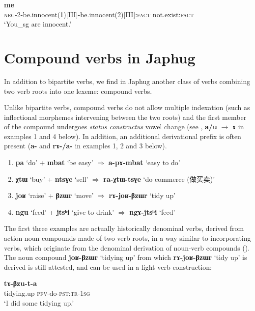 \documentclass[oneside,a4paper,11pt]{article}
\newcommand{\ipa}[1]{{\phon\textbf{#1}}}
\newcommand{\zh}[1]{{\cn #1}}
\newcommand{\jpg}[2]{\ipa{#1} `#2'}
\begin{document}
\begin{exe}
\ex \label{ex:mAtWspe2}
\gll \ipa{mɤ-tɯ-spe=rke} \ipa{me} \\
\textsc{neg}-2-be.innocent(1)[III]-be.innocent(2)[III]:\textsc{fact} not.exist:\textsc{fact} \\
\glt `You_{sg} are innocent.'
\end{exe} 

\section{Compound verbs in Japhug} \label{sec:compounds}
In addition to bipartite verbs, we find in Japhug another class of verbs combining two verb roots into one lexeme: compound verbs.

Unlike bipartite verbs,  compound verbs do not allow multiple indexation (such as inflectional morphemes intervening between the two roots) and the first member of the compound undergoes \textit{status constructus} vowel change (see  \citealt[1215]{jacques12incorp}, \ipa{a/u} $\rightarrow$ \ipa{ɤ} in examples 1 and 4 below). In addition, an additional derivational prefix is often present (\ipa{a-} and \ipa{rɤ-/a-} in examples 1, 2 and 3 below).

\begin{enumerate}
\item \jpg{pa}{do} + \jpg{mbat}{be easy} $\Rightarrow$ \jpg{a-pɤ-mbat}{easy to do}
\item \jpg{χtɯ}{buy} + \jpg{ntsɣe}{sell} $\Rightarrow$ \jpg{ra-χtɯ-tsɣe}{do commerce (\zh{做买卖})} 
\item \jpg{joʁ}{raise} + \jpg{βzɯr}{move}   $\Rightarrow$  \jpg{rɤ-joʁ-βzɯr}{tidy up}
\item \jpg{ngu}{feed} + \jpg{jtsʰi}{give to drink} $\Rightarrow$ \jpg{ngɤ-jtsʰi}{feed}
\end{enumerate}

The first three examples are actually historically denominal verbs, derived from action noun compounds made of two verb roots, in a way similar to incorporating verbs, which originate from the denominal derivation of noun-verb compounds (\citealt{jacques12incorp}). The noun compound \jpg{joʁ-βzɯr}{tidying up} from which \jpg{rɤ-joʁ-βzɯr}{tidy up} is derived is still attested, and can be used in a light verb construction:

\begin{exe}
\ex 
 \gll \ipa{joʁβzɯr} \ipa{tɤ-βzu-t-a} \\
 tidying.up \textsc{pfv}-do-\textsc{pst:tr-1sg} \\
 \glt `I did some tidying up.'
\end{exe}
\end{document}
